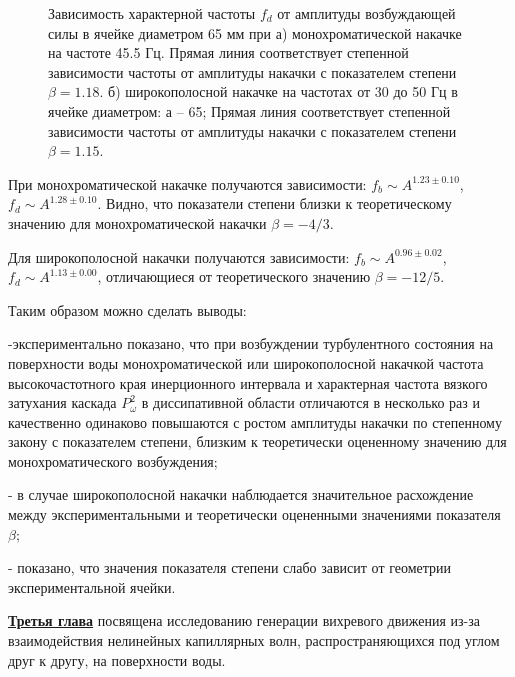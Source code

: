 \begin{figure}[ht]
 \begin{minipage}[ht]{0.49\linewidth}
 \end{minipage}
 \hfill
 \begin{minipage}[ht]{0.49\linewidth}
 \end{minipage}
 \caption{Зависимость характерной частоты $f_d$ от амплитуды возбуждающей силы в ячейке диаметром 65 мм при а) монохроматической накачке на частоте 45.5 Гц. Прямая линия соответствует степенной зависимости частоты от амплитуды накачки с показателем степени $\beta = 1.18$.
 б) широкополосной накачке на частотах от 30 до 50 Гц в ячейке диаметром: а – 65; Прямая линия соответствует степенной зависимости частоты от амплитуды накачки с показателем степени $\beta = 1.15$.}
 \label{img:water_fd_65} 
\end{figure}


При монохроматической накачке получаются зависимости: $f_b \sim A^{1.23 \pm 0.10}$,  $f_d \sim A^{1.28 \pm 0.10}$. Видно, что показатели степени близки к теоретическому значению для монохроматической накачки $\beta = -4/3$.

Для широкополосной накачки получаются зависимости: $f_b \sim A^{0.96 \pm 0.02}$,  $f_d \sim A^{1.13 \pm 0.00}$, отличающиеся от теоретического значению $\beta = -12/5$.

Таким образом можно сделать выводы:

-экспериментально показано, что при возбуждении турбулентного состояния на поверхности воды монохроматической или широкополосной накачкой частота высокочастотного края инерционного интервала и характерная частота вязкого затухания каскада $P_\omega^2$ в диссипативной области отличаются в несколько раз и качественно одинаково повышаются с ростом амплитуды накачки по степенному закону с показателем степени, близким к теоретически оцененному значению для монохроматического возбуждения;

- в случае широкополосной накачки наблюдается значительное расхождение между экспериментальными и теоретически оцененными значениями показателя $\beta$; 

- показано, что значения показателя степени слабо зависит от геометрии экспериментальной ячейки.

\underline{\textbf{Третья глава}} посвящена исследованию генерации вихревого движения из-за взаимодействия нелинейных капиллярных волн, распространяющихся под углом друг к другу, на поверхности воды.


